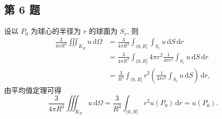 \documentclass[../main.tex]{subfiles}
\begin{document}
\subsection{第 6 题}
设以 $P_0$ 为球心的半径为 $r$ 的球面为 $S_r$, 则
\begin{align*}
    \frac{3}{4 \pi R^3} \iiint_{K_R} u \, \mathrm{d} \Omega
    &= \frac{3}{4 \pi R^3} \int_{(0, R]} \int_{S_r} u \, \mathrm{d}S \, \mathrm{d}r \\
    &= \frac{3}{4 \pi R^3} \int_{(0, R]} 4 \pi r^2 \frac{1}{4 \pi r^2} \int_{S_r} u \, \mathrm{d}S \, \mathrm{d}r \\
    &= \frac{3}{R^3} \int_{(0, R]} r^2 \left( \frac{1}{4 \pi r^2} \int_{S_r} u \, \mathrm{d}S \right)  \, \mathrm{d}r
    ,
\end{align*}
由平均值定理可得
\[
    \frac{3}{4 \pi R^3} \iiint_{K_R} u \, \mathrm{d} \Omega
    = \frac{3}{R^3} \int_{(0, R]} r^2 u \left( P_0 \right) \, \mathrm{d}r
    = u \left( P_0 \right). 
\]
\end{document}
